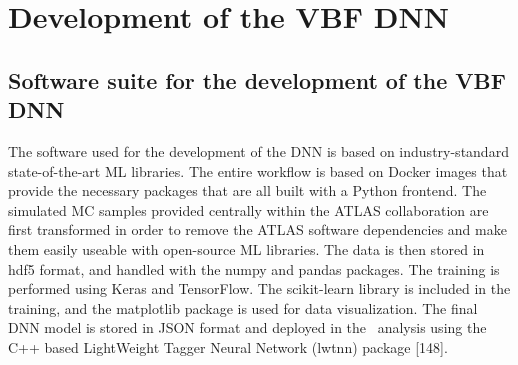 \chapter{Development of the VBF DNN}


\section{Software suite for the development of the VBF DNN}
\label{app:software-suite}
The software used for the development of the DNN is based on industry-standard state-of-the-art ML libraries. 
The entire workflow is based on Docker images that provide the necessary packages that are all built with a Python frontend. The simulated MC samples provided centrally within the ATLAS collaboration are first transformed in order to remove the ATLAS software dependencies and make them easily useable with open-source ML libraries. The data is then stored in hdf5 format, and handled with the numpy and pandas packages. The training is performed using Keras and TensorFlow. The scikit-learn library is included in the training, and the matplotlib package is used for data visualization. The final DNN model is stored in JSON format and deployed in the \HWW\ analysis using the C++ based LightWeight Tagger Neural Network (lwtnn) package [148].
    









